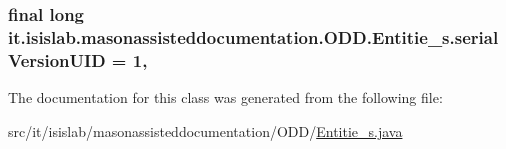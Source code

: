 \hypertarget{classit_1_1isislab_1_1masonassisteddocumentation_1_1_o_d_d_1_1_entitie__s_aa12b66678b973801bfbdb835efe277a7}{
\subsubsection[{serial\-Version\-U\-I\-D}]{\setlength{\rightskip}{0pt plus 5cm}final long it.\-isislab.\-masonassisteddocumentation.\-O\-D\-D.\-Entitie\-\_\-s.\-serial\-Version\-U\-I\-D = 1\hspace{0.3cm}{\ttfamily [static]}, {\ttfamily [private]}}}\label{classit_1_1isislab_1_1masonassisteddocumentation_1_1_o_d_d_1_1_entitie__s_aa12b66678b973801bfbdb835efe277a7}


The documentation for this class was generated from the following file\-:\begin{DoxyCompactItemize}
\item 
src/it/isislab/masonassisteddocumentation/\-O\-D\-D/\hyperlink{_entitie__s_8java}{Entitie\-\_\-s.\-java}\end{DoxyCompactItemize}
